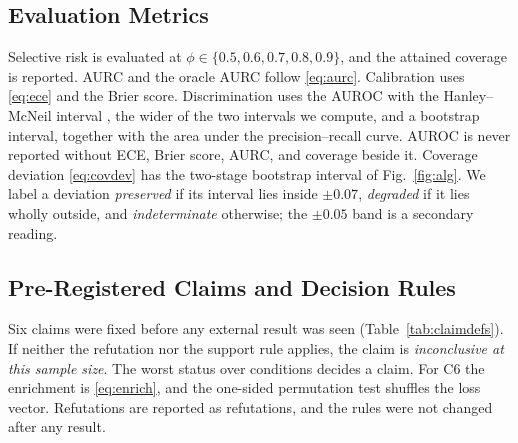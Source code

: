 \documentclass[journal]{IEEEtran}
\begin{document}
\subsection{Evaluation Metrics}
Selective risk is evaluated at $\phi\in\{0.5,0.6,0.7,0.8,0.9\}$, and the attained coverage is reported. AURC and the oracle AURC follow \eqref{eq:aurc}. Calibration uses \eqref{eq:ece} and the Brier score. Discrimination uses the AUROC with the Hanley--McNeil interval \cite{hanley1982}, the wider of the two intervals we compute, and a bootstrap interval, together with the area under the precision--recall curve. AUROC is never reported without ECE, Brier score, AURC, and coverage beside it. Coverage deviation \eqref{eq:covdev} has the two-stage bootstrap interval of Fig.~\ref{fig:alg}. We label a deviation \emph{preserved} if its interval lies inside $\pm0.07$, \emph{degraded} if it lies wholly outside, and \emph{indeterminate} otherwise; the $\pm0.05$ band is a secondary reading.

\subsection{Pre-Registered Claims and Decision Rules}
\label{sec:claims}
Six claims were fixed before any external result was seen (Table~\ref{tab:claimdefs}). If neither the refutation nor the support rule applies, the claim is \emph{inconclusive at this sample size}. The worst status over conditions decides a claim. For C6 the enrichment is \eqref{eq:enrich}, and the one-sided permutation test shuffles the loss vector. Refutations are reported as refutations, and the rules were not changed after any result.
\end{document}
